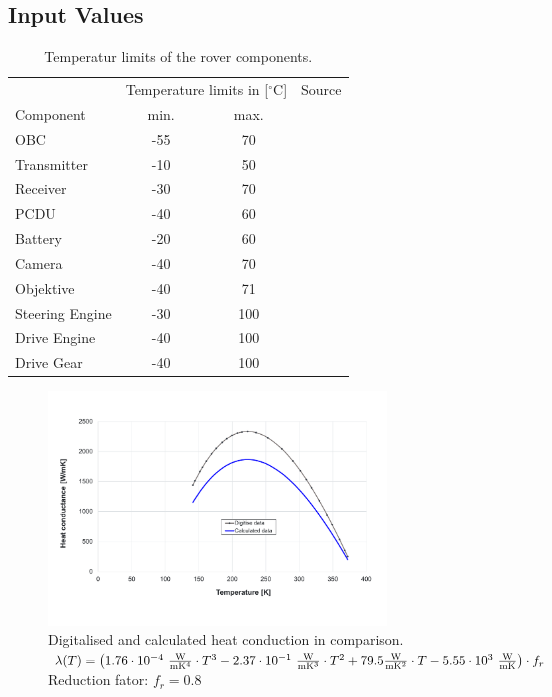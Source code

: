 \subsection{Input Values} \label{sec:app_therm_5}
\begin{table}[htb]
	\centering
	\caption{Temperatur limits of the rover components.}
	\begin{tabular}{lccc}
		\hline
		& \multicolumn{2}{l}{Temperature limits in [$^\circ$C]} & Source\\ 
		Component	&	min. & max. &\\\hline
		OBC & -55 & 70 & \\
		Transmitter & -10 & 50 & \\
		Receiver & -30 & 70 & \\
		PCDU & -40 & 60 & \\
		Battery & -20 & 60 & \cite{SAFTBatteries.2018}\\
		Camera & -40 & 70  & \\
		Objektive  & -40 & 71 & \\
		Steering Engine & -30 & 100 & \\
		Drive Engine & -40 & 100 & \\
		Drive Gear & -40 & 100  & \\ \hline
	\end{tabular}
	\label{tab:tcs_limits}
\end{table}

\begin{figure}[htb] 
	\centering
	\includegraphics[width=0.8\textwidth]{Media/tcs_lynx_calc}
	\caption{Digitalised \cite{ref_tcs_01} and calculated heat conduction in comparison.\\[0.75em] $\lambda(T)= \left(1.76 \cdot 10^{-4}\ \frac{\W}{\m \K^4} \cdot T^3 -2.37\cdot 10^{-1}\ \frac{\W}{\m \K^3} \cdot T^2 +79.5 \frac{\W}{\m \K^2} \cdot T -5.55\cdot 10^{3}\ \frac{\W}{\m \K}\right) \cdot f_{r}  $ \\[0.75em] Reduction fator: $f_{r}=0.8$}
	\label{fig:tcs_lynx}
\end{figure}

